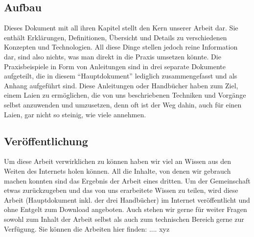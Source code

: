 \subsection{Aufbau}
Dieses Dokument mit all ihren Kapitel stellt den Kern unserer Arbeit dar. Sie enthält Erklärungen, Definitionen, Übersicht und Details zu verschiedenen Konzepten und Technologien. All diese Dinge stellen jedoch reine Information dar, sind also nichts, was man direkt in die Praxis umsetzen könnte. Die Praxisbeispiele in Form von Anleitungen sind in drei separate Dokumente aufgeteilt, die in diesem ``Hauptdokument'' lediglich zusammengefasst und als Anhang aufgeführt sind. Diese Anleitungen oder Handbücher haben zum Ziel, einem Laien zu ermöglichen, die von uns beschriebenen Techniken und Vorgänge selbst anzuwenden und umzusetzen, denn oft ist der Weg dahin, auch für einen Laien, gar nicht so steinig, wie viele annehmen.

\subsection{Veröffentlichung}
Um diese Arbeit verwirklichen zu können haben wir viel an Wissen aus den Weiten des Internets holen können. All die Inhalte, von denen wir gebrauch machen konnten sind das Ergebnis der Arbeit eines dritten. Um der Gemeinschaft etwas zurückzugeben und das von uns erarbeitete Wissen zu teilen, wird diese Arbeit (Hauptdokument inkl. der drei Handbücher) im Internet veröffentlicht und ohne Entgelt zum Download angeboten. Auch stehen wir gerne für weiter Fragen sowohl zum Inhalt der Arbeit selbst als auch zum technischen Bereich gerne zur Verfügung.
Sie können die Arbeiten hier finden: .... xyz
